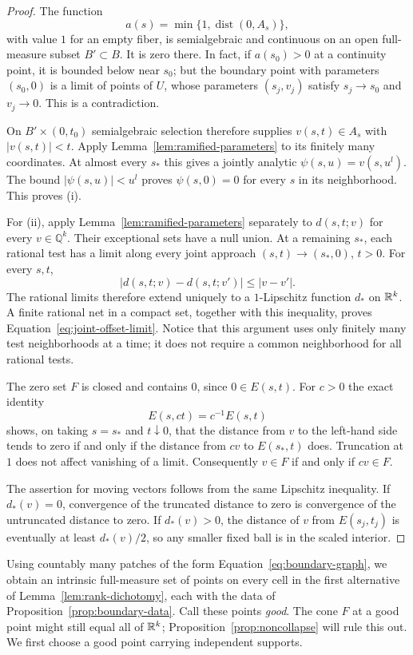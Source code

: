 \begin{proof}
The function
\[
 a(s)=\min\{1,\operatorname{dist}(0,A_s)\},
\]
with value $1$ for an empty fiber, is semialgebraic and continuous on
an open full-measure subset $B'\subset B$.  It is zero there.  In fact,
if $a(s_0)>0$ at a continuity point, it is bounded below near $s_0$;
but the boundary point with parameters $(s_0,0)$ is a limit of points
of $U$, whose parameters $(s_j,v_j)$ satisfy $s_j\to s_0$ and
$v_j\to0$.  This is a contradiction.

On $B'\times(0,t_0)$ semialgebraic selection therefore supplies
$v(s,t)\in A_s$ with $|v(s,t)|<t$.  Apply
Lemma~\ref{lem:ramified-parameters} to its finitely many coordinates.
At almost every $s_*$ this gives a jointly analytic
$\psi(s,u)=v(s,u^l)$.  The bound $|\psi(s,u)|<u^l$ proves
$\psi(s,0)=0$ for every $s$ in its neighborhood.  This proves (i).

For (ii), apply Lemma~\ref{lem:ramified-parameters} separately to
$d(s,t;v)$ for every $v\in\mathbb{Q}^k$.  Their exceptional sets have
a null union.  At a remaining $s_*$, each rational test has a limit
along every joint approach $(s,t)\to(s_*,0)$, $t>0$.  For every $s,t$,
\[
 |d(s,t;v)-d(s,t;v')|\leq |v-v'|.
\]
The rational limits therefore extend uniquely to a $1$-Lipschitz
function $d_*$ on $\mathbb R^k$.  A finite rational net in a compact set,
together with this inequality, proves
Equation~\eqref{eq:joint-offset-limit}.  Notice that this argument
uses only finitely many test neighborhoods at a time; it does not
require a common neighborhood for all rational tests.

The zero set $F$ is closed and contains $0$, since $0\in E(s,t)$.
For $c>0$ the exact identity
\[
 E(s,ct)=c^{-1}E(s,t)
\]
shows, on taking $s=s_*$ and $t\downarrow0$, that the distance from
$v$ to the left-hand side tends to zero if and only if the distance
from $cv$ to $E(s_*,t)$ does.  Truncation at $1$ does not affect
vanishing of a limit.  Consequently $v\in F$ if and only if $cv\in F$.

The assertion for moving vectors follows from the same Lipschitz
inequality.  If $d_*(v)=0$, convergence of the truncated distance to
zero is convergence of the untruncated distance to zero.  If
$d_*(v)>0$, the distance of $v$ from $E(s_j,t_j)$ is eventually at
least $d_*(v)/2$, so any smaller fixed ball is in the scaled interior.
\end{proof}

Using countably many patches of the form
Equation~\eqref{eq:boundary-graph}, we obtain an intrinsic full-measure
set of points on every cell in the first alternative of
Lemma~\ref{lem:rank-dichotomy}, each with the data of
Proposition~\ref{prop:boundary-data}.  Call these points \emph{good}.
The cone $F$ at a good point might still equal all of $\mathbb R^k$;
Proposition~\ref{prop:noncollapse} will rule this out.  We first choose
a good point carrying independent supports.

